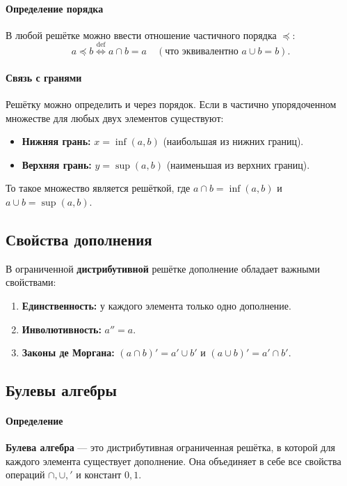 \paragraph{Определение порядка}
В любой решётке можно ввести отношение частичного порядка $\preceq$:
$$a \preceq b \stackrel{\text{def}}{\iff} a \cap b = a \quad (\text{что эквивалентно } a \cup b = b).$$

\paragraph{Связь с гранями}
Решётку можно определить и через порядок. Если в частично упорядоченном множестве для любых двух элементов существуют:
\begin{itemize}
    \item \textbf{Нижняя грань:} $x = \inf(a, b)$ (наибольшая из нижних границ).
    \item \textbf{Верхняя грань:} $y = \sup(a, b)$ (наименьшая из верхних границ).
\end{itemize}
То такое множество является решёткой, где $a \cap b = \inf(a, b)$ и $a \cup b = \sup(a, b)$.

\subsection*{Свойства дополнения}
В ограниченной \textbf{дистрибутивной} решётке дополнение обладает важными свойствами:
\begin{enumerate}
    \item \textbf{Единственность:} у каждого элемента только одно дополнение.
    \item \textbf{Инволютивность:} $a'' = a$.
    \item \textbf{Законы де Моргана:} $(a \cap b)' = a' \cup b'$ и $(a \cup b)' = a' \cap b'$.
\end{enumerate}

\subsection*{Булевы алгебры}

\paragraph{Определение}
\textbf{Булева алгебра} — это дистрибутивная ограниченная решётка, в которой для каждого элемента существует дополнение.
Она объединяет в себе все свойства операций $\cap, \cup, '$ и констант $0, 1$.

